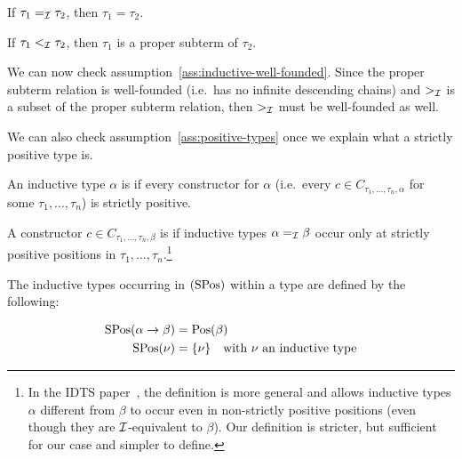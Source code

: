 \begin{corollary}\label{cor:inductive-type-eq}
  If $\tau_1 =_{\mathcal{I}} \tau_2$, then $\tau_1 = \tau_2$.
\end{corollary}

\begin{corollary}\label{cor:inductive-type-lt}
  If $\tau_1 <_{\mathcal{I}} \tau_2$, then $\tau_1$ is a proper subterm of $\tau_2$.
\end{corollary}

We can now check assumption~\ref{ass:inductive-well-founded}. Since the
proper subterm relation is well-founded (i.e.\ has no infinite descending
chains) and $>_{\mathcal{I}}$ is a subset of the proper subterm relation, then
$>_{\mathcal{I}}$ must be well-founded as well.

We can also check assumption~\ref{ass:positive-types} once we explain what a
strictly positive type is.

\begin{definition}
  An inductive type $\alpha$ is  if every
  constructor for $\alpha$ (i.e.\ every
  $c \in C_{\tau_1,\ldots,\tau_n,\alpha}$ for some
  $\tau_1, \ldots, \tau_n$) is strictly positive.
\end{definition}

\begin{definition}\label{def:positive-constructor}
  A constructor $c \in C_{\tau_1,\ldots,\tau_n,\beta}$ is  if inductive types $\alpha =_{\mathcal{I}} \beta$ occur only at
  strictly positive positions in $\tau_1, \ldots, \tau_n$.\footnote{In the
    IDTS paper~\cite{blanqui2002inductive}, the definition is more general
    and allows inductive types $\alpha$ different from $\beta$ to occur
    even in non-strictly positive positions (even though they are
    $\mathcal{I}$-equivalent to $\beta$). Our definition is stricter, but
    sufficient for our case and simpler to define.}
\end{definition}

\begin{definition}
  The inductive types occurring in 
  $(\operatorname{SPos})$ within a type are defined by the following:

  \begin{align*}
    \operatorname{SPos}(\alpha \to \beta) &= \operatorname{Pos}(\beta) \\
    \operatorname{SPos}(\nu) &= \{ \nu \} \text{\quad with $\nu$ an inductive type} \\
  \end{align*}
\end{definition}

